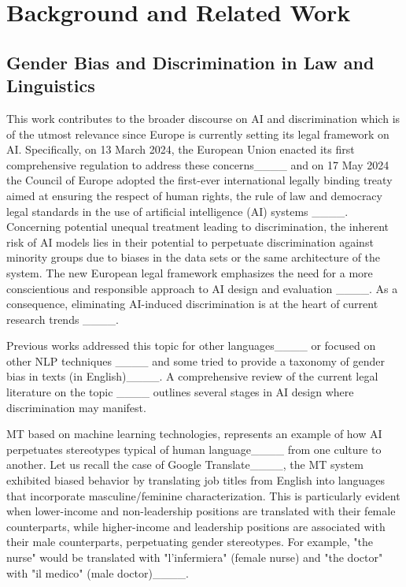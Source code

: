 \section{Background and Related Work}
\label{s:rw}
\subsection{Gender Bias and Discrimination in Law and Linguistics}
This work contributes to the broader discourse on AI and discrimination which is of the utmost relevance since Europe is currently setting its legal framework on AI. Specifically, on 13 March 2024, the European Union enacted its first comprehensive regulation to address these concerns____ and on 17 May 2024 the Council of Europe adopted the first-ever international legally binding treaty aimed at ensuring the respect of human rights, the rule of law and democracy legal standards in the use of artificial intelligence (AI) systems ____. Concerning potential unequal treatment leading to discrimination, the inherent risk of AI models lies in their potential to perpetuate discrimination against minority groups due to biases in the data sets or the same architecture of the system. The new European legal framework emphasizes the need for a more conscientious and responsible approach to AI design and evaluation ____. As a consequence, eliminating AI-induced discrimination is at the heart of current research trends ____. 

Previous works addressed this topic for other languages____ or focused on other NLP techniques ____ and some tried to provide a taxonomy of gender bias in texts (in English)____. A comprehensive review of the current legal literature on the topic ____ outlines several stages in AI design where discrimination may manifest. 

MT based on machine learning technologies, represents an example of how AI perpetuates stereotypes typical of human language____ from one culture to another. Let us recall the case of Google Translate____, the MT system exhibited biased behavior by translating job titles from English into languages that incorporate masculine/feminine characterization. This is particularly evident when lower-income and non-leadership positions are translated with their female counterparts, while higher-income and leadership positions are associated with their male counterparts, perpetuating gender stereotypes. For example, "the nurse" would be translated with "l'infermiera" (female nurse) and "the doctor" with "il medico" (male doctor)____.

